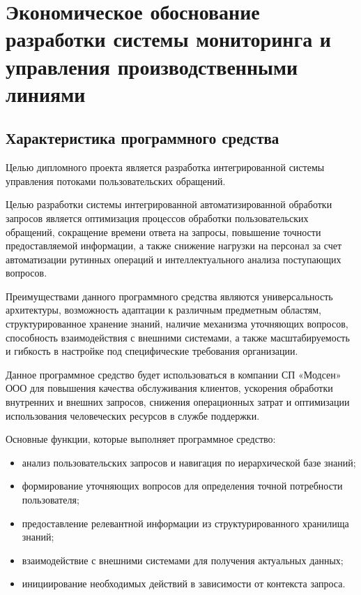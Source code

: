 \section{Экономическое обоснование разработки системы мониторинга и управления производственными линиями}
\label{sec:economics}

\subsection{Характеристика программного средства}

Целью дипломного проекта является разработка интегрированной
системы управления потоками пользовательских обращений.

Целью разработки системы интегрированной автоматизированной
обработки запросов является оптимизация процессов обработки
пользовательских обращений, сокращение времени ответа на запросы,
повышение точности предоставляемой информации, а также снижение
нагрузки на персонал за счет автоматизации рутинных операций и
интеллектуального анализа поступающих вопросов.

Преимуществами данного программного средства являются
универсальность архитектуры, возможность адаптации к различным
предметным областям, структурированное хранение знаний, наличие
механизма уточняющих вопросов, способность взаимодействия с внешними
системами, а также масштабируемость и гибкость в настройке под
специфические требования организации.

Данное программное средство будет использоваться в компании СП
«Модсен» ООО для повышения качества обслуживания клиентов, ускорения
обработки внутренних и внешних запросов, снижения операционных затрат и
оптимизации использования человеческих ресурсов в службе поддержки.

Основные функции, которые выполняет программное средство:
\begin{itemize}
    \item анализ пользовательских запросов и навигация по иерархической базе
знаний;
    \item формирование уточняющих вопросов для определения точной
потребности пользователя;
    \item предоставление релевантной информации из структурированного
хранилища знаний;
    \item взаимодействие с внешними системами для получения актуальных
данных;
    \item инициирование необходимых действий в зависимости от контекста
запроса.
\end{itemize}

